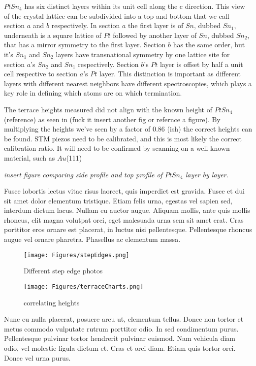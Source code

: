 $PtSn_4$ has six distinct layers within its unit cell along the c direction. This view of the crystal lattice can be subdivided into a top and bottom that we call section $a$ and $b$ respectively. In section $a$ the first layer is of $Sn$, dubbed $Sn_1$, underneath is a square lattice of $Pt$ followed by another layer of $Sn$, dubbed $Sn_2$, that has a mirror symmetry to the first layer. Section $b$ has the same order, but it's $Sn_1$ and $Sn_2$ layers have transnational symmetry by one lattice site for section $a$'s $Sn_2$ and $Sn_1$ respectively. Section $b$'s $Pt$ layer is offset by half a unit cell respective to section $a$'s $Pt$ layer. This distinction is important as different layers with different nearest neighbors have different spectroscopies, which plays a key role in defining which atoms are on which termination.

The terrace heights measured did not align with the known height of $PtSn_4$ (reference) as seen in (fuck it insert another fig or refernce a figure). By multiplying the heights we've seen by a factor of 0.86 (ish) the correct heights can be found. STM piezos need to be calibrated, and this is most likely the correct calibration ratio. It will need to be confirmed by scanning on a well known material, such as $Au$(111)

\emph{insert figure comparing side profile and top profile of $PtSn_4$ layer by layer.}

Fusce lobortis lectus vitae risus laoreet, quis imperdiet est gravida. Fusce et dui sit amet dolor elementum tristique. Etiam felis urna, egestas vel sapien sed, interdum dictum lacus. Nullam eu auctor augue. Aliquam mollis, ante quis mollis rhoncus, elit magna volutpat orci, eget malesuada urna sem sit amet erat. Cras porttitor eros ornare est placerat, in luctus nisi pellentesque. Pellentesque rhoncus augue vel ornare pharetra. Phasellus ac elementum massa.

    \begin{figure}[h]
        \centering
        \texttt{[image: Figures/stepEdges.png]}
        \caption{Different step edge photos}
        \label{fig:stm}
    \end{figure}
    \begin{figure}
        \centering
        \texttt{[image: Figures/terraceCharts.png]}
        \caption{correlating heights}
        \label{fig:stm}
    \end{figure} 


Nunc eu nulla placerat, posuere arcu ut, elementum tellus. Donec non tortor et metus commodo vulputate rutrum porttitor odio. In sed condimentum purus. Pellentesque pulvinar tortor hendrerit pulvinar euismod. Nam vehicula diam odio, vel molestie ligula dictum et. Cras et orci diam. Etiam quis tortor orci. Donec vel urna purus.



